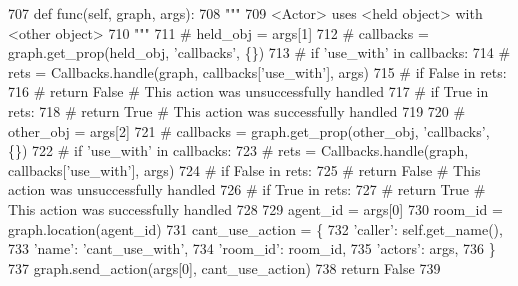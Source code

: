 \begin{DoxyCode}
707     \textcolor{keyword}{def }func(self, graph, args):
708         \textcolor{stringliteral}{"""}
709 \textcolor{stringliteral}{        <Actor> uses <held object> with <other object>}
710 \textcolor{stringliteral}{        """}
711         \textcolor{comment}{# held\_obj = args[1]}
712         \textcolor{comment}{# callbacks = graph.get\_prop(held\_obj, 'callbacks', \{\})}
713         \textcolor{comment}{# if 'use\_with' in callbacks:}
714         \textcolor{comment}{#     rets = Callbacks.handle(graph, callbacks['use\_with'], args)}
715         \textcolor{comment}{#     if False in rets:}
716         \textcolor{comment}{#         return False  # This action was unsuccessfully handled}
717         \textcolor{comment}{#     if True in rets:}
718         \textcolor{comment}{#         return True  # This action was successfully handled}
719 
720         \textcolor{comment}{# other\_obj = args[2]}
721         \textcolor{comment}{# callbacks = graph.get\_prop(other\_obj, 'callbacks', \{\})}
722         \textcolor{comment}{# if 'use\_with' in callbacks:}
723         \textcolor{comment}{#     rets = Callbacks.handle(graph, callbacks['use\_with'], args)}
724         \textcolor{comment}{#     if False in rets:}
725         \textcolor{comment}{#         return False  # This action was unsuccessfully handled}
726         \textcolor{comment}{#     if True in rets:}
727         \textcolor{comment}{#         return True  # This action was successfully handled}
728 
729         agent\_id = args[0]
730         room\_id = graph.location(agent\_id)
731         cant\_use\_action = \{
732             \textcolor{stringliteral}{'caller'}: self.get\_name(),
733             \textcolor{stringliteral}{'name'}: \textcolor{stringliteral}{'cant\_use\_with'},
734             \textcolor{stringliteral}{'room\_id'}: room\_id,
735             \textcolor{stringliteral}{'actors'}: args,
736         \}
737         graph.send\_action(args[0], cant\_use\_action)
738         \textcolor{keywordflow}{return} \textcolor{keyword}{False}
739 
\end{DoxyCode}
\mbox{\label{classlight__chats_1_1graph_1_1UseFunction_ae9056a0aa6e94b1d11be472b2549b2c2}} 
